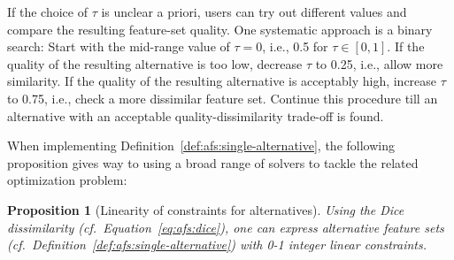 \documentclass{article}
\newtheorem{proposition}{Proposition}
\theoremstyle{definition}
\begin{document}
If the choice of $\tau$ is unclear a priori, users can try out different values and compare the resulting feature-set quality.
One systematic approach is a binary search:
Start with the mid-range value of $\tau=0$, i.e., 0.5 for $\tau \in [0,1]$.
If the quality of the resulting alternative is too low, decrease $\tau$ to 0.25, i.e., allow more similarity.
If the quality of the resulting alternative is acceptably high, increase $\tau$ to 0.75, i.e., check a more dissimilar feature set.
Continue this procedure till an alternative with an acceptable quality-dissimilarity trade-off is found.

When implementing Definition~\ref{def:afs:single-alternative}, the following proposition gives way to using a broad range of solvers to tackle the related optimization problem:
%
\begin{proposition}[Linearity of constraints for alternatives]
	Using the Dice dissimilarity (cf.~Equation~\ref{eq:afs:dice}), one can express alternative feature sets (cf.~Definition~\ref{def:afs:single-alternative}) with 0-1 integer linear constraints.
	\label{prop:afs:linear-constraints}
\end{proposition}
%
\end{document}
